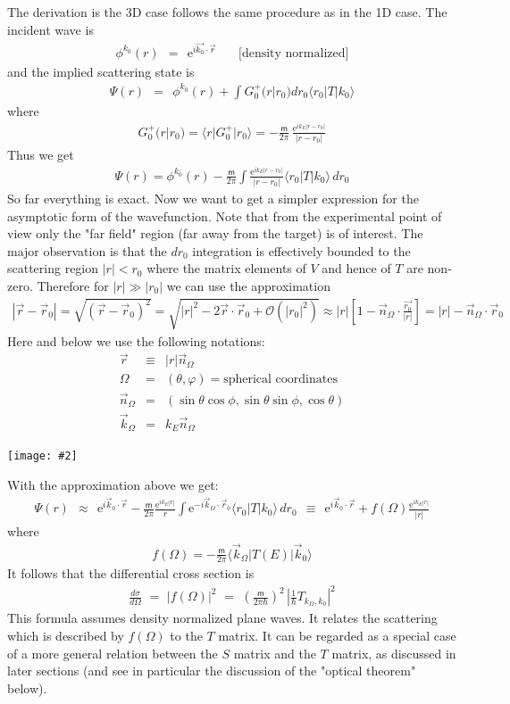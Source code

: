 \documentclass[onecolumn,fleqn, 11pt]{revtex4}
\newcommand{\eexp}{\mathrm{e}^}
\newcommand{\mass}{\mathsf{m}}
\newcommand{\putgraph}[2][0.30\hsize]{\texttt{[image: \#2]}}
\newcommand{\beq}{\begin{eqnarray}}
\newcommand{\eeq}{\end{eqnarray}}
\begin{document}
The derivation is the 3D case follows the same procedure as in the 1D case.
The incident wave is 
\beq
\phi^{k_0}(r) \ \ = \ \ \eexp{ i \vec {k_0} \cdot \vec{r} }
\ \ \ \ \ \ \ \ \mbox{[density normalized]}
\eeq
and the implied scattering state is  
\beq
\Psi(r) \ \ =  \ \ \phi^{k_0}(r)+ \int G_0^{+}(r|r_0) dr_0  \langle r_0 | T | k_0 \rangle 
\eeq
where
\beq
G_0^{+}(r|r_0) = \langle r|G_0^{+}|r_0\rangle = 
-\frac{\mass}{2\pi}\,\frac{\eexp{ik_E|r-r_0|}}{|r-r_0|}
\eeq
Thus we get
\beq
\Psi(r)=\phi^{k_0}(r)
-  \frac{\mass}{2\pi} \int 
\frac{\eexp{ik_E |r-r_0|}}{|r-r_0|} 
\langle r_0|T|k_0 \rangle \, dr_0 
\eeq
So far everything is exact.
Now we want to get a simpler expression for 
the asymptotic form of the wavefunction. 
Note that from the experimental point of view 
only the "far field" region (far away from the target) 
is of interest. 
The major observation is that the $dr_0$ integration 
is effectively bounded to the scattering region $|r|<r_0$ 
where the matrix elements of $V$ and hence of $T$ are 
non-zero. Therefore for $|r|\gg |r_0|$ we can use the approximation
\beq
|\vec{r}-\vec{r}_0| = \sqrt{(\vec{r}-\vec{r}_0)^2} 
= \sqrt{|r|^2 - 2\vec{r} \cdot \vec{r}_0 + \mathcal{O}(|r_0|^2)} 
\approx |r| \left[ 1 - \vec{n}_{\Omega} \cdot \frac{\vec{r_0}}{|r|} \right]
= |r| - \vec{n}_{\Omega} \cdot \vec{r}_0
\eeq
Here and below we use the following notations:
\beq
\vec{r}  &\equiv&  |r| \vec{n}_{\Omega}
\\ \nonumber
\Omega &=& (\theta, \varphi) = \mbox{spherical coordinates}
\\ \nonumber
\vec{n}_{\Omega} &=& (\sin\theta\cos\phi, \sin\theta\sin\phi, \cos\theta)
\\ \nonumber
\vec{k}_{\Omega} &=& k_E \vec{n}_{\Omega}
\eeq


\begin{center}
\putgraph[0.6\hsize]{SphericalCoordinates}
\end{center}

With the approximation above we get:
\beq
\Psi(r) \ \ \approx \ \  
\eexp{i \vec{k}_0\cdot\vec r}
-\frac{\mass}{2\pi}
\frac{ \eexp{i k_E |r|} }{r}
\int \eexp{-i\vec{k}_{\Omega} \cdot \vec{r}_0} 
\langle r_0|T|k_0\rangle \, dr_0
\ \ \equiv \ \ 
\eexp{i \vec{k}_0\cdot \vec{r}}
+ f(\Omega)\frac{ \eexp{i k_E |r|} }{|r|}
\eeq
where
\beq
f(\Omega) = -\frac{\mass}{2\pi} 
\langle \vec{k}_{\Omega} | T(E)| \vec{k}_0 \rangle
\eeq
It follows that the differential cross section is 
\beq
\frac {d\sigma}{d\Omega}\,\,=\,\, 
|f(\Omega)|^2 \,\,=\,\, 
\left(\frac{\mass}{2\pi\hbar}\right)^2
\, \left| \frac{1}{\hbar} T_{k_{\Omega},k_0}\right|^2
\eeq
This formula assumes density normalized plane waves.
It relates the scattering which is described by $f(\Omega)$ 
to the $T$ matrix. It can be regarded as a special case 
of a more general relation between the $S$ matrix 
and the $T$ matrix, as discussed in later sections 
(and see in particular the discussion of the "optical theorem" below). 
   
\end{document}
